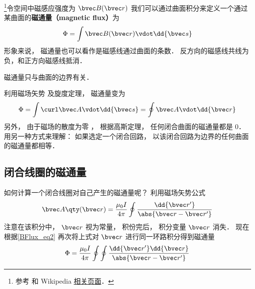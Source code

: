 
\begin{issues}
\issueDraft
{}
\end{issues}


\footnote{参考 \cite{GriffE} 和 Wikipedia \href{https://en.wikipedia.org/wiki/Magnetic_flux}{相关页面}．}令空间中磁感应强度为 $\bvec B(\bvec r)$ 我们可以通过曲面积分来定义一个通过某曲面的\textbf{磁通量（magnetic flux）}为
\begin{equation}
\Phi  = \int \bvec B(\bvec r) \vdot \dd{\bvec s}
\end{equation}
形象来说， 磁通量也可以看作是磁感线通过曲面的条数． 反方向的磁感线共线为负，和正方向磁感线抵消．

磁通量只与曲面的边界有关．


利用磁场矢势%
及旋度定理， %
磁通量变为
\begin{equation} \label{BFlux_eq2}
\Phi  = \int \curl \bvec A \vdot \dd{\bvec s}  = \oint \bvec A \vdot \dd{\bvec r}
\end{equation}
另外， 由于磁场的散度为零%
， 根据高斯定理， 任何闭合曲面的磁通量都是 0． 用另一种方式来理解： 如果选定一个闭合回路， 以该闭合回路为边界的任何曲面的磁通量都相等．

\subsection{闭合线圈的磁通量}

如何计算一个闭合线圈对自己产生的磁通量呢？ 利用磁场矢势公式
\begin{equation}
\bvec A \qty(\bvec r) = \frac{\mu_0 I}{4 \pi} \oint \frac{\dd{\bvec r'}}{\abs{\bvec r - \bvec r'}}
\end{equation}
注意在该积分中， $\bvec r$ 视为常量， 积份完后， 积分变量 $\bvec r$ 消失． 现在根据\autoref{BFlux_eq2} 再次将上式对 $\bvec r$ 进行同一环路积分得到磁通量
\begin{equation}
\Phi  = \frac{\mu_0 I}{4\pi} \oint\oint \frac{\dd{\bvec r'} \dd{\bvec r}}{\abs{\bvec r - \bvec r'}}
\end{equation}
